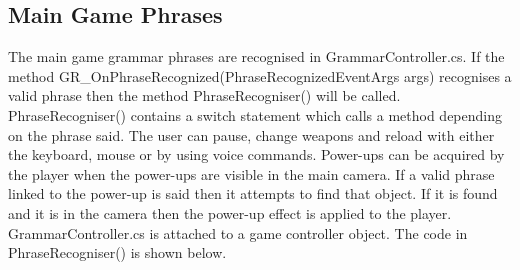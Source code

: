 \documentclass{article}
\begin{document}
\subsection{Main Game Phrases}
The main game grammar phrases are recognised in GrammarController.cs. If the method GR\_OnPhraseRecognized(PhraseRecognizedEventArgs args) recognises a valid phrase then the method PhraseRecogniser() will be called. PhraseRecogniser() contains a switch statement which calls a method depending on the phrase said. The user can pause, change weapons and reload with either the keyboard, mouse or by using voice commands. Power-ups can be acquired by the player when the power-ups are visible in the main camera. If a valid phrase linked to the power-up is said then it attempts to find that object. If it is found and it is in the camera then the power-up effect is applied to the player. GrammarController.cs is attached to a game controller object. The code in PhraseRecogniser() is shown below.
\end{document}
